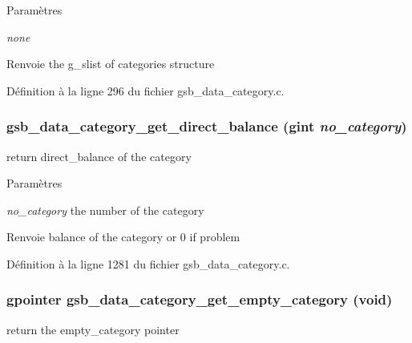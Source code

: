 \begin{DoxyParams}{Paramètres}
\item[{\em none}]\end{DoxyParams}
\begin{DoxyReturn}{Renvoie}
the g\_\-slist of categories structure 
\end{DoxyReturn}


Définition à la ligne 296 du fichier gsb\_\-data\_\-category.c.

\subsubsection[{gsb\_\-data\_\-category\_\-get\_\-direct\_\-balance}]{ gsb\_\-data\_\-category\_\-get\_\-direct\_\-balance (gint {\em no\_\-category})}\label{gsb__data__category_8h_ab0bd6098046498d7d3de366ffc6dd177}
return direct\_\-balance of the category


\begin{DoxyParams}{Paramètres}
\item[{\em no\_\-category}]the number of the category\end{DoxyParams}
\begin{DoxyReturn}{Renvoie}
balance of the category or 0 if problem 
\end{DoxyReturn}


Définition à la ligne 1281 du fichier gsb\_\-data\_\-category.c.

\subsubsection[{gsb\_\-data\_\-category\_\-get\_\-empty\_\-category}]{\setlength{\rightskip}{0pt plus 5cm}gpointer gsb\_\-data\_\-category\_\-get\_\-empty\_\-category (void)}\label{gsb__data__category_8h_ac519a744a6487c166367b5e12fb3f2b5}
return the empty\_\-category pointer


